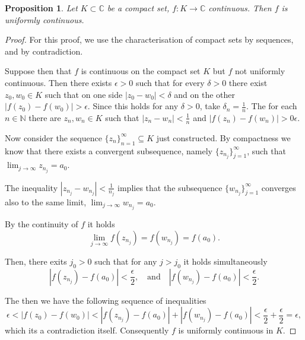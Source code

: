 \documentclass{amsart}
\newtheorem{prop}{Proposition}
\begin{document}
\begin{prop}
Let \(K\subset \mathbb{C}\) be a compact set, \(f:K\to\mathbb{C}\) continuous. Then \(f\) is uniformly continuous.
\end{prop}
\begin{proof}
For this proof, we use the characterisation of compact sets by sequences, and by contradiction.

Suppose then that \(f\) is continuous on the compact set \(K\) but \(f\) not uniformly continuous. Then there exists \(\epsilon >0\) such that for every \(\delta >0\) 
there exist \(z_0,w_0\in K\) such that on one side \(|z_0 - w_0 | < \delta\) and on the other \(|f(z_0) - f(w_0)| > \epsilon\).
Since this holds for any \(\delta >0\), take \(\delta_n = \frac{1}{n}\). The for each \(n\in \mathbb{N}\) there are \(z_n, w_n\in K\) such that
\(|z_n - w_n | < \frac{1}{n}\) and \(|f(z_n) - f(w_n)| >0 \epsilon\).

Now consider the sequence \(\{z_n\}_{n=1}^{\infty}\subseteq K\) just constructed. By compactness we know that there exists a convergent subsequence, namely
\(\{z_{n_j}\}_{j=1}^{\infty}\), such that \(\lim_{j\to \infty} z_{n_j} = a_0\).

The inequality \(| z_{n_j} - w_{n_j} | < \frac{1}{n_j}\) implies that the subsequence \(\{w_{n_j}\}_{j=1}^{\infty}\) converges also to the same limit, \(\lim_{j\to \infty} w_{n_j} = a_0\).

By the continuity of \(f\) it holds
\[ \lim_{j\to \infty} f(z_{n_j}) = f(w_{n_j}) = f(a_0). \]

Then, there exits \(j_0>0\) such that for any \(j > j_0\) it holds simultaneously 
\[ | f(z_{n_j}) - f(a_0) | < \frac{ \epsilon}{2}, \quad \mbox{and}\quad | f(w_{n_j}) - f(a_0) | < \frac{ \epsilon}{2}. \]

The then we have the following sequence of inequalities
\[ \epsilon < |f(z_0) - f(w_0)| < | f(z_{n_j}) - f(a_0) | +  | f(w_{n_j}) - f(a_0) | < \frac{ \epsilon}{2} + \frac{\epsilon}{2} = \epsilon, \]
which its a contradiction itself. Consequently \(f\) is uniformly continuous in \(K\).
\end{proof}
\end{document}
